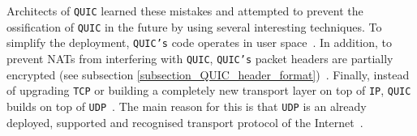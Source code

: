 \documentclass[12pt,a4paper,twoside,openright]{report}
\begin{document}
Architects of \texttt{QUIC} learned these mistakes and attempted to prevent the ossification of \texttt{QUIC} in the future by using several interesting techniques.
To simplify the deployment, \texttt{QUIC's} code operates in user space~\cite{quic-and-http-3-too-big-to-fail}.
In addition, to prevent NATs from interfering with \texttt{QUIC}, \texttt{QUIC's} packet headers are partially encrypted (see subsection \ref{subsection_QUIC_header_format})~\cite{bib_Netdev_0x13_QUIC_Tutorial}.
Finally, instead of upgrading \texttt{TCP} or building a completely new transport layer on top of \texttt{IP}, \texttt{QUIC} builds on top of \texttt{UDP}~\cite{chromium_blog_about_quic}.
The main reason for this is that \texttt{UDP} is an already deployed, supported and recognised transport protocol of the Internet~\cite{the-road-to-quic}.
\end{document}
